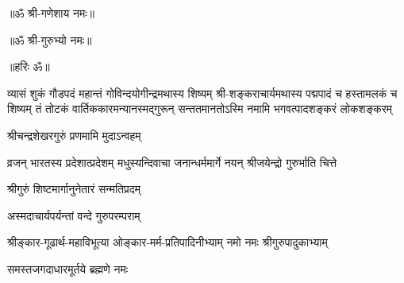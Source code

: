 

\centerline{॥ॐ श्री-गणेशाय नमः॥}
\centerline{॥ॐ श्री-गुरुभ्यो नमः॥}
\centerline{॥हरिः ॐ॥}


\setlength{\shlokaspaceskip}{0pt}
%
{व्यासं शुकं गौडपदं महान्तं गोविन्दयोगीन्द्रमथास्य शिष्यम्}%
{श्री-शङ्कराचार्यमथास्य पद्मपादं च हस्तामलकं च शिष्यम्}%
{तं तोटकं वार्तिककारमन्यानस्मद्गुरून् सन्ततमानतोऽस्मि}%
\setlength{\shlokaspaceskip}{24pt}
{नमामि भगवत्पादशङ्करं लोकशङ्करम्}

{श्रीचन्द्रशेखरगुरुं प्रणमामि मुदाऽन्वहम्}

{व्रजन् भारतस्य प्रदेशात्प्रदेशम्}
{मधुस्यन्दिवाचा जनान्धर्ममार्गे}
{नयन् श्रीजयेन्द्रो गुरुर्भाति चित्ते}

{श्रीगुरुं शिष्टमार्गानुनेतारं सन्मतिप्रदम्}

{अस्मदाचार्यपर्यन्तां वन्दे गुरुपरम्पराम्}

{श्रीङ्कार-गूढार्थ-महाविभूत्या}
{ओङ्कार-मर्म-प्रतिपादिनीभ्याम्}
{नमो नमः श्रीगुरुपादुकाभ्याम्}

{समस्तजगदाधारमूर्तये ब्रह्मणे नमः}
